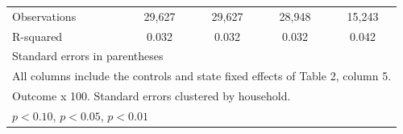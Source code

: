 \begin{table}[htbp]
\begin{tabular}{l*{4}{c}}
Observations        &      29,627         &      29,627         &      28,948         &      15,243         \\
R-squared           &       0.032         &       0.032         &       0.032         &       0.042         \\
\bottomrule
\multicolumn{5}{l}{\footnotesize Standard errors in parentheses}\\
\multicolumn{5}{l}{\footnotesize All columns include the controls and state fixed effects of Table 2, column 5.}\\
\multicolumn{5}{l}{\footnotesize Outcome x 100. Standard errors clustered by household.}\\
\multicolumn{5}{l}{\footnotesize \sym{*} \(p<0.10\), \sym{**} \(p<0.05\), \sym{***} \(p<0.01\)}\\
\end{tabular}
\end{table}
